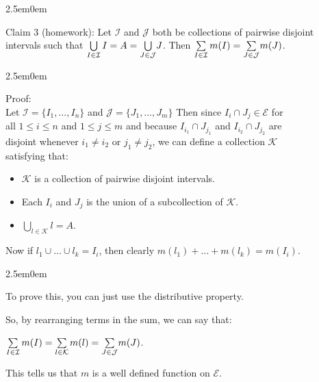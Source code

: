 \documentclass{book}
\newcommand{\exOne}{%
   \color{Purple}%
   \fontsize{14}{16}\selectfont%
}
\newcommand{\exTwo}{%
   \color{RedViolet}%
   \fontsize{13}{15}\selectfont%
}
\newcommand{\exP}{%
   \color{VioletRed}%
   \fontsize{12}{14}\selectfont%
}
\newenvironment{myIndent}{%
   \begin{adjustwidth}{2.5em}{0em}%
}{%
   \end{adjustwidth}%
}
\newcommand{\retTwo}{\hfill\bigbreak}
\begin{document}
{\begin{myIndent}\exOne
   Claim 3 (homework): Let $\mathcal{I}$ and $\mathcal{J}$ both be collections of pairwise disjoint\\ intervals such that $\bigcup\limits_{I \in \mathcal{I}}I = A = \bigcup\limits_{J \in \mathcal{J}}\hspace{-0.2em}J$.\hspace{0.2em} Then $\sum\limits_{I \in \mathcal{I}}m(I) = \sum\limits_{J \in \mathcal{J}}\hspace{-0.15em}m(J)$.\retTwo

   {\begin{myIndent}\exTwo
      Proof:\\
      Let $\mathcal{I} = \{I_1, \ldots, I_n\}$ and $\mathcal{J} = \{J_1, \ldots, J_m\}$ Then since $I_i \cap J_j \in \mathcal{E}$ for\\ all $1 \leq i \leq n$ and $1 \leq j \leq m$ and because $I_{i_1} \cap J_{j_1}$ and $I_{i_2} \cap J_{j_2}$ are\\ disjoint whenever $i_1 \neq i_2$ or $j_1 \neq j_2$, we can define a collection $\mathcal{K}$\\ satisfying that:
      \begin{itemize}
         \item $\mathcal{K}$ is a collection of pairwise disjoint intervals.
         \item Each $I_i$ and $J_j$ is the union of a subcollection of $\mathcal{K}$.
         \item $\bigcup\limits_{l \in \mathcal{K}}l = A$.\retTwo
      \end{itemize}

      Now if $l_1 \cup \ldots \cup l_k = I_i$, then clearly $m(l_1) + \ldots + m(l_k) = m(I_i)$.
      {\begin{myIndent}\exP
         To prove this, you can just use the distributive property.\retTwo
      \end{myIndent}} 
      
      So, by rearranging terms in the sum, we can say that:
      
      {\centering $\sum\limits_{I \in \mathcal{I}}m(I) = \sum\limits_{l \in \mathcal{K}}\hspace{-0.04em}m(l) = \sum\limits_{J \in \mathcal{J}}\hspace{-0.15em}m(J)$.\retTwo\par}
   \end{myIndent}}

   This tells us that $m$ is a well defined function on $\mathcal{E}$.\retTwo


\end{myIndent}}
\end{document}
